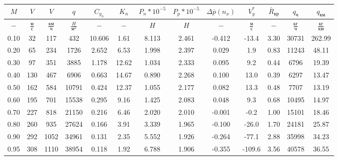 \begin{tabular}{|c|c|c|c|c|c|c|c|c|c|c|c|c|}
\hline
$M$ & $V$ & $V$ & $q$ & $C_{y_n}$ & $K_n$ & $P_n*10^{-5}$ & $P_p*10^{-5}$ & $\Delta \bar{p}(n_x)$ & $V_y^*$ & $\bar{R}_{кр}$ & $q_{ч}$ & $q_{км}$ \\ 
\hline
$-$ & $\frac{м}{с}$ & $\frac{км}{ч}$ & $\frac{H}{м^2}$ & $-$ & $-$ & $H$ & $H$ & $-$ & $\frac{м}{с}$ & $-$ & $\frac{кг}{ч}$ & $\frac{кг}{км}$ \\ 
\hline
0.10 & 32 & 117 & 432 & 10.606 & 1.61 & 8.113 & 2.461 & -0.412 & -13.4 & 3.30 & 30731 & 262.99 \\ 
\hline
0.20 & 65 & 234 & 1726 & 2.652 & 6.53 & 1.998 & 2.397 & 0.029 & 1.9 & 0.83 & 11243 & 48.11 \\ 
\hline
0.30 & 97 & 351 & 3885 & 1.178 & 12.62 & 1.034 & 2.333 & 0.095 & 9.2 & 0.44 & 6796 & 19.39 \\ 
\hline
0.40 & 130 & 467 & 6906 & 0.663 & 14.67 & 0.890 & 2.268 & 0.100 & 13.0 & 0.39 & 6297 & 13.47 \\ 
\hline
0.50 & 162 & 584 & 10791 & 0.424 & 12.37 & 1.055 & 2.177 & 0.082 & 13.3 & 0.48 & 7707 & 13.19 \\ 
\hline
0.60 & 195 & 701 & 15538 & 0.295 & 9.16 & 1.425 & 2.083 & 0.048 & 9.3 & 0.68 & 10495 & 14.97 \\ 
\hline
0.70 & 227 & 818 & 21150 & 0.216 & 6.46 & 2.020 & 2.010 & -0.001 & -0.2 & 1.00 & 15101 & 18.46 \\ 
\hline
0.80 & 260 & 935 & 27624 & 0.166 & 3.91 & 3.339 & 1.965 & -0.100 & -26.0 & 1.70 & 24181 & 25.87 \\ 
\hline
0.90 & 292 & 1052 & 34961 & 0.131 & 2.35 & 5.552 & 1.926 & -0.264 & -77.1 & 2.88 & 35998 & 34.23 \\ 
\hline
0.95 & 308 & 1110 & 38954 & 0.118 & 1.92 & 6.788 & 1.906 & -0.355 & -109.6 & 3.56 & 40578 & 36.55 \\ 
\hline
\end{tabular}